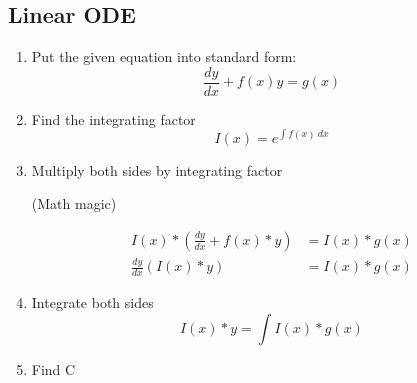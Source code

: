 	\subsection{Linear ODE}
	\begin{enumerate}
	\item Put the given equation into standard form:
	\begin{equation}
	\frac{dy}{dx}+f(x)y=g(x)
	\end{equation}
	\item Find the integrating factor
	\begin{equation}
	I(x)=e^{\int f(x)\ dx}
	\end{equation}
	\item Multiply both sides by integrating factor
	\begin{tiny}
	(Math magic)
	\end{tiny}
	\begin{align*}
	I(x)*\left(\frac{dy}{dx}+f(x)*y\right)&=I(x)*g(x)\\
	\frac{dy}{dx}\left( I(x)*y\right) &=I(x)*g(x)
	\end{align*}
	\item Integrate both sides
	\begin{equation}
	I(x)*y=\int I(x)*g(x)
	\end{equation}
	\item Find C
	\end{enumerate}